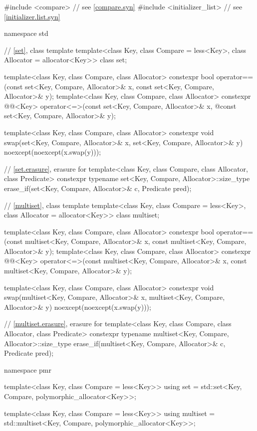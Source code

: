 %
\begin{codeblock}
#include <compare>              // see \ref{compare.syn}
#include <initializer_list>     // see \ref{initializer.list.syn}

namespace std {
  // \ref{set}, class template 
  template<class Key, class Compare = less<Key>, class Allocator = allocator<Key>>
    class set;

  template<class Key, class Compare, class Allocator>
    constexpr bool operator==(const set<Key, Compare, Allocator>& x,
                              const set<Key, Compare, Allocator>& y);
  template<class Key, class Compare, class Allocator>
    constexpr @@<Key> operator<=>(const set<Key, Compare, Allocator>& x,
    @\itcorr@                                                const set<Key, Compare, Allocator>& y);

  template<class Key, class Compare, class Allocator>
    constexpr void swap(set<Key, Compare, Allocator>& x,
                        set<Key, Compare, Allocator>& y)
      noexcept(noexcept(x.swap(y)));

  // \ref{set.erasure}, erasure for 
  template<class Key, class Compare, class Allocator, class Predicate>
    constexpr typename set<Key, Compare, Allocator>::size_type
      erase_if(set<Key, Compare, Allocator>& c, Predicate pred);

  // \ref{multiset}, class template 
  template<class Key, class Compare = less<Key>, class Allocator = allocator<Key>>
    class multiset;

  template<class Key, class Compare, class Allocator>
    constexpr bool operator==(const multiset<Key, Compare, Allocator>& x,
                              const multiset<Key, Compare, Allocator>& y);
  template<class Key, class Compare, class Allocator>
    constexpr @@<Key>
      operator<=>(const multiset<Key, Compare, Allocator>& x,
                  const multiset<Key, Compare, Allocator>& y);

  template<class Key, class Compare, class Allocator>
    constexpr void swap(multiset<Key, Compare, Allocator>& x,
                        multiset<Key, Compare, Allocator>& y)
      noexcept(noexcept(x.swap(y)));

  // \ref{multiset.erasure}, erasure for 
  template<class Key, class Compare, class Allocator, class Predicate>
    constexpr typename multiset<Key, Compare, Allocator>::size_type
      erase_if(multiset<Key, Compare, Allocator>& c, Predicate pred);

  namespace pmr {
    template<class Key, class Compare = less<Key>>
      using set = std::set<Key, Compare, polymorphic_allocator<Key>>;

    template<class Key, class Compare = less<Key>>
      using multiset = std::multiset<Key, Compare, polymorphic_allocator<Key>>;
  }
}
\end{codeblock}

